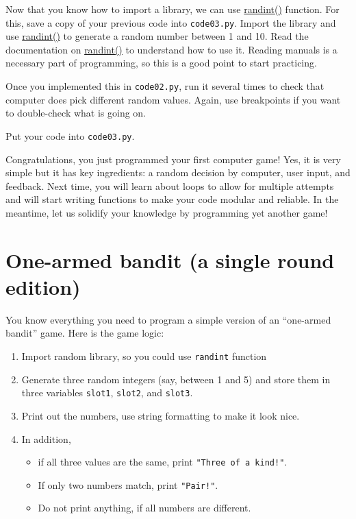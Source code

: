 \documentclass[
]{book}
\providecommand{\tightlist}{%
  \setlength{\itemsep}{0pt}\setlength{\parskip}{0pt}}
\begin{document}
Now that you know how to import a library, we can use \href{https://docs.python.org/3/library/random.html\#random.randint}{randint()} function. For this, save a copy of your previous code into \texttt{code03.py}. Import the library and use \href{https://docs.python.org/3/library/random.html\#random.randint}{randint()} to generate a random number between 1 and 10. Read the documentation on \href{https://docs.python.org/3/library/random.html\#random.randint}{randint()} to understand how to use it. Reading manuals is a necessary part of programming, so this is a good point to start practicing.

Once you implemented this in \texttt{code02.py}, run it several times to check that computer does pick different random values. Again, use breakpoints if you want to double-check what is going on.

Put your code into \texttt{code03.py}.

Congratulations, you just programmed your first computer game! Yes, it is very simple but it has key ingredients: a random decision by computer, user input, and feedback. Next time, you will learn about loops to allow for multiple attempts and will start writing functions to make your code modular and reliable. In the meantime, let us solidify your knowledge by programming yet another game!

\hypertarget{one-armed-bandit-a-single-round-edition}{%
\section{One-armed bandit (a single round edition)}\label{one-armed-bandit-a-single-round-edition}}

You know everything you need to program a simple version of an ``one-armed bandit'' game. Here is the game logic:

\begin{enumerate}
\def\labelenumi{\arabic{enumi}.}
\tightlist
\item
  Import random library, so you could use \texttt{randint} function
\item
  Generate three random integers (say, between 1 and 5) and store them in three variables \texttt{slot1}, \texttt{slot2}, and \texttt{slot3}.
\item
  Print out the numbers, use string formatting to make it look nice.
\item
  In addition,

  \begin{itemize}
  \tightlist
  \item
    if all three values are the same, print \texttt{"Three\ of\ a\ kind!"}.
  \item
    If only two numbers match, print \texttt{"Pair!"}.
  \item
    Do not print anything, if all numbers are different.
  \end{itemize}
\end{enumerate}
\end{document}
